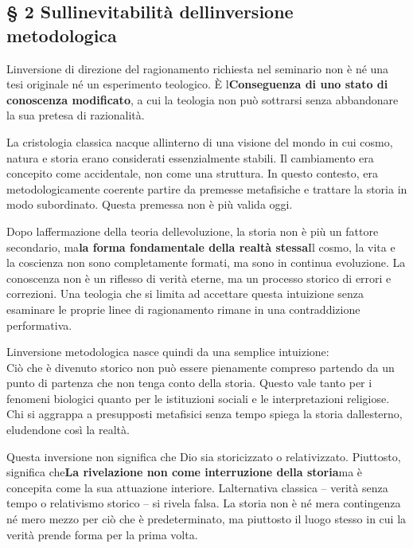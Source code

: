 \documentclass[
]{article}
\begin{document}
\subsection{\texorpdfstring{\textbf{§ 2 Sull\textquotesingle inevitabilità dell\textquotesingle inversione metodologica}}{§ 2 Sull\textquotesingle inevitabilità dell\textquotesingle inversione metodologica}}\label{sullinevitabilituxe0-dellinversione-metodologica}

L\textquotesingle inversione di direzione del ragionamento richiesta nel seminario non è né una tesi originale né un esperimento teologico. È l\textquotesingle{}\textbf{Conseguenza di uno stato di conoscenza modificato}, a cui la teologia non può sottrarsi senza abbandonare la sua pretesa di razionalità.

La cristologia classica nacque all\textquotesingle interno di una visione del mondo in cui cosmo, natura e storia erano considerati essenzialmente stabili. Il cambiamento era concepito come accidentale, non come una struttura. In questo contesto, era metodologicamente coerente partire da premesse metafisiche e trattare la storia in modo subordinato. Questa premessa non è più valida oggi.

Dopo l\textquotesingle affermazione della teoria dell\textquotesingle evoluzione, la storia non è più un fattore secondario, ma\textbf{la forma fondamentale della realtà stessa}Il cosmo, la vita e la coscienza non sono completamente formati, ma sono in continua evoluzione. La conoscenza non è un riflesso di verità eterne, ma un processo storico di errori e correzioni. Una teologia che si limita ad accettare questa intuizione senza esaminare le proprie linee di ragionamento rimane in una contraddizione performativa.

L\textquotesingle inversione metodologica nasce quindi da una semplice intuizione:\\
Ciò che è divenuto storico non può essere pienamente compreso partendo da un punto di partenza che non tenga conto della storia. Questo vale tanto per i fenomeni biologici quanto per le istituzioni sociali e le interpretazioni religiose. Chi si aggrappa a presupposti metafisici senza tempo spiega la storia dall\textquotesingle esterno, eludendone così la realtà.

Questa inversione non significa che Dio sia storicizzato o relativizzato. Piuttosto, significa che\textbf{La rivelazione non come interruzione della storia}ma è concepita come la sua attuazione interiore. L\textquotesingle alternativa classica -- verità senza tempo o relativismo storico -- si rivela falsa. La storia non è né mera contingenza né mero mezzo per ciò che è predeterminato, ma piuttosto il luogo stesso in cui la verità prende forma per la prima volta.
\end{document}
